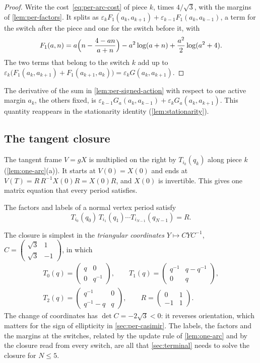 \begin{proof}
Write the cost~\eqref{eq:per-arc-cost} of piece $k$, times $4/\sqrt3$, with the margins of
\cref{lem:per-factors}. It splits as $\varepsilon_kF_1(a_k,a_{k+1})+\varepsilon_{k-1}F_1(a_k,a_{k-1})$, a
term for the switch after the piece and one for the switch before it, with
\[
  F_1(a,n)=a\Bigl(n-\frac{4-an}{a+n}\Bigr)-a^2\log(a+n)+\frac{a^2}{2}\log(a^2+4).
\]
The two terms that belong to the switch $k$ add up to
$\varepsilon_k\bigl(F_1(a_k,a_{k+1})+F_1(a_{k+1},a_k)\bigr)=\varepsilon_kG(a_k,a_{k+1})$.
\end{proof}

The derivative of the sum in \cref{lem:per-signed-action} with respect to one active margin
$a_k$, the others fixed, is $\varepsilon_{k-1}G_a(a_k,a_{k-1})+\varepsilon_kG_a(a_k,a_{k+1})$. This quantity
reappears in the stationarity identity (\cref{lem:stationarity}).

\subsection{The tangent closure}\label{sec:per-closure}

The tangent frame $V=gX$ is multiplied on the right by $T_{i_k}(q_k)$ along piece $k$
(\cref{lem:one-arc}(a)). It starts at $V(0)=X(0)$ and ends at $V(T)=R\,R^{-1}X(0)R=X(0)R$, and
$X(0)$ is invertible. This gives one matrix equation that every period satisfies.

\begin{lemma}\label{lem:tangent-closure}
The factors and labels of a normal vertex period satisfy
\[
  T_{i_0}(q_0)\,T_{i_1}(q_1)\cdots T_{i_{N-1}}(q_{N-1})=R.
\]
\end{lemma}

The closure is simplest in the \emph{triangular coordinates} $Y\mapsto CYC^{-1}$,
$C=\left(\begin{smallmatrix}\sqrt3&1\\\sqrt3&-1\end{smallmatrix}\right)$, in which
\begin{gather*}
  T_0(q)=\begin{pmatrix}q&0\\0&q^{-1}\end{pmatrix},\qquad
  T_1(q)=\begin{pmatrix}q^{-1}&q-q^{-1}\\0&q\end{pmatrix},\\
  T_2(q)=\begin{pmatrix}q^{-1}&0\\q^{-1}-q&q\end{pmatrix},\qquad
  R=\begin{pmatrix}0&1\\-1&1\end{pmatrix}.
\end{gather*}
The change of coordinates
has $\det C=-2\sqrt3<0$: it reverses orientation, which matters for the sign of ellipticity in
\cref{sec:per-casimir}. The labels, the factors and the margins at the switches, related by the
update rule of \cref{lem:one-arc} and by the closure read from every switch, are all that
\cref{sec:terminal} needs to solve the closure for $N\le5$.

